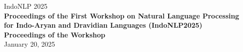 \documentclass[11pt,a4paper]{article}
\begin{document}
  \begin{center}
  \LARGE
  IndoNLP 2025 \\
  \vfill
  {\bf
   Proceedings of the First Workshop on Natural Language Processing for Indo-Aryan and Dravidian Languages (IndoNLP2025)\\
    \vfill
    Proceedings of the Workshop\\
  }
  \vfill
  January 20, 2025
  \end{center}
\end{document}
